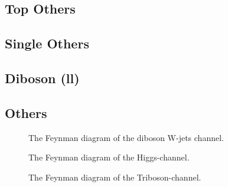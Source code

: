 \subsection{Top Others}
\subsection{Single Others}
\subsection{Diboson (ll)}
\subsection{Others}

\begin{figure}
    \centering
    \caption{The Feynman diagram of the diboson W-jets channel.}
    \label{fig:w_pjets}
\end{figure}
\begin{figure}
    \centering
    \caption{The Feynman diagram of the Higgs-channel.}
    \label{fig:h}
\end{figure}
\begin{figure}
    \centering
    \caption{The Feynman diagram of the Triboson-channel.}
    \label{fig:zzz}
\end{figure}
